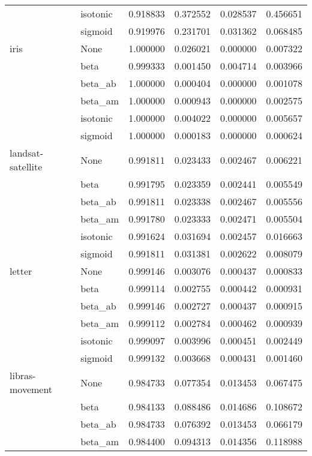 \begin{tabular}{llrrrr}
        & isotonic &  0.918833 &  0.372552 &  0.028537 &  0.456651 \\
        & sigmoid &  0.919976 &  0.231701 &  0.031362 &  0.068485 \\
iris & None &  1.000000 &  0.026021 &  0.000000 &  0.007322 \\
        & beta &  0.999333 &  0.001450 &  0.004714 &  0.003966 \\
        & beta\_ab &  1.000000 &  0.000404 &  0.000000 &  0.001078 \\
        & beta\_am &  1.000000 &  0.000943 &  0.000000 &  0.002575 \\
        & isotonic &  1.000000 &  0.004022 &  0.000000 &  0.005657 \\
        & sigmoid &  1.000000 &  0.000183 &  0.000000 &  0.000624 \\
landsat-satellite & None &  0.991811 &  0.023433 &  0.002467 &  0.006221 \\
        & beta &  0.991795 &  0.023359 &  0.002441 &  0.005549 \\
        & beta\_ab &  0.991811 &  0.023338 &  0.002467 &  0.005556 \\
        & beta\_am &  0.991780 &  0.023333 &  0.002471 &  0.005504 \\
        & isotonic &  0.991624 &  0.031694 &  0.002457 &  0.016663 \\
        & sigmoid &  0.991811 &  0.031381 &  0.002622 &  0.008079 \\
letter & None &  0.999146 &  0.003076 &  0.000437 &  0.000833 \\
        & beta &  0.999114 &  0.002755 &  0.000442 &  0.000931 \\
        & beta\_ab &  0.999146 &  0.002727 &  0.000437 &  0.000915 \\
        & beta\_am &  0.999112 &  0.002784 &  0.000462 &  0.000939 \\
        & isotonic &  0.999097 &  0.003996 &  0.000451 &  0.002449 \\
        & sigmoid &  0.999132 &  0.003668 &  0.000431 &  0.001460 \\
libras-movement & None &  0.984733 &  0.077354 &  0.013453 &  0.067475 \\
        & beta &  0.984133 &  0.088486 &  0.014686 &  0.108672 \\
        & beta\_ab &  0.984733 &  0.076392 &  0.013453 &  0.066179 \\
        & beta\_am &  0.984400 &  0.094313 &  0.014356 &  0.118988 \\

\end{tabular}
